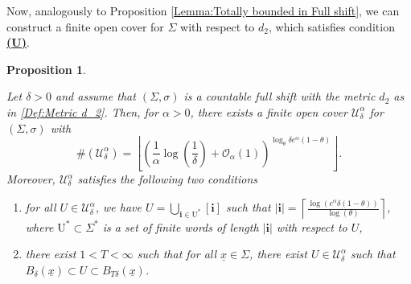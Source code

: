 \documentclass[11pt, reqno]{amsart}
\theoremstyle{plain}%
\newtheorem{proposition}[theorem]{Proposition}
\theoremstyle{definition}
\theoremstyle{definition}
\def\U{\ensuremath{\mathcal U}}
\def\st{such that }
\def\ulx{\underline{x}}
\numberwithin{equation}{section}
\begin{document}
Now, analogously to Proposition \ref{Lemma:Totally bounded in Full shift}, we can construct a finite open cover for $\Sigma$ with respect to $d_2$, which satisfies condition \hyperref[Condition (U)]{\textbf{(U)}}.

\begin{proposition}\label{Lemma:Totally bounded in Full shift d_2}
   
     Let $\delta>0$ and assume that $(\Sigma,\sigma)$ is a countable full shift with the metric $d_2$ as in \eqref{Def:Metric d_2}. Then, for $\alpha>0$, there exists a finite open cover $\U_{\delta}^{\alpha}$ for $(\Sigma,\sigma)$ with $$\#(\U_{\delta}^{\alpha})=\left\lfloor\left( \frac{1}{\alpha} \log \left(\frac{1}{\delta}\right)+\mathcal{O}_\alpha(1)\right) ^ { \log_\theta{\delta e^\alpha(1-\theta)}}\right\rfloor.$$
    Moreover, $\U_{\delta}^{\alpha}$ satisfies the following two conditions
\begin{enumerate}
    \item for all $U\in \U_{\delta}^{\alpha}$, we have $U=\bigcup_{\mathbf{i}\in \mathrm{U^*}}[\mathbf{i}]$ \st $|\mathbf{i}|= \left\lceil\frac{\log(e^{\alpha}\delta(1-\theta))}{\log(\theta)}\right\rceil$, where $\mathrm{U^*}\subset\Sigma^*$ is a set of finite words of length $|\mathbf{i}|$ with respect to $U$,
    \item there exist $1<T<\infty$ \st for all $\ulx\in \Sigma$, there exist  $U\in \U_{\delta}^{\alpha}$ \st $B_{\delta}(\ulx)\subset U \subset B_{T\delta}(\ulx)$.
\end{enumerate}
    
\end{proposition}
\end{document}
